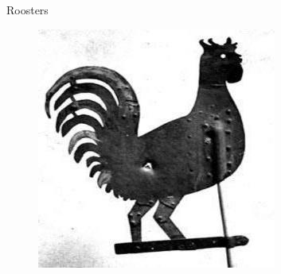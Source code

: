 \documentclass{beamer}
\begin{document}
\begin{frame}{Roosters}
\begin{figure}
    \includegraphics[scale=.4]{roosterrs-image_0004.jpg}
  \end{figure}
\end{frame}
\end{document}
